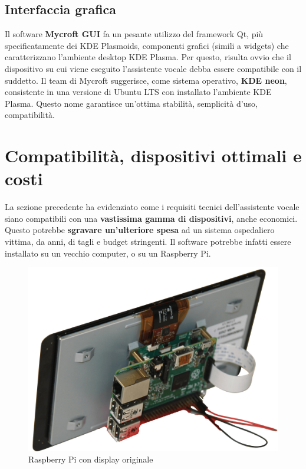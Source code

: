 \subsection{Interfaccia grafica}
Il software \textbf{Mycroft GUI} fa un pesante utilizzo del framework Qt, più specificatamente dei KDE Plasmoids, componenti grafici (simili a widgets) che caratterizzano l'ambiente desktop KDE Plasma. Per questo, risulta ovvio che il dispositivo su cui viene eseguito l'assistente vocale debba essere compatibile con il suddetto. Il team di Mycroft suggerisce, come sistema operativo, \textbf{KDE neon}, consistente in una versione di  Ubuntu LTS con installato l'ambiente KDE Plasma. Questo nome garantisce un'ottima stabilità, semplicità d'uso, compatibilità.
\section{Compatibilità, dispositivi ottimali e costi}
La sezione precedente ha evidenziato come i requisiti tecnici dell'assistente vocale siano compatibili con una \textbf{vastissima gamma di dispositivi}, anche economici. Questo potrebbe \textbf{sgravare un'ulteriore spesa} ad un sistema ospedaliero vittima, da anni, di tagli e budget stringenti. Il software potrebbe infatti essere installato su un vecchio computer, o su un Raspberry Pi.
\begin{figure}[H]
  \begin{center}
    \includegraphics[width=0.8\columnwidth]{images/applicabilita/RPiwithDisplay.jpg}
  \end{center}
  \caption{Raspberry Pi con display originale}
  \label{fig:raspi-with-display}
\end{figure}

